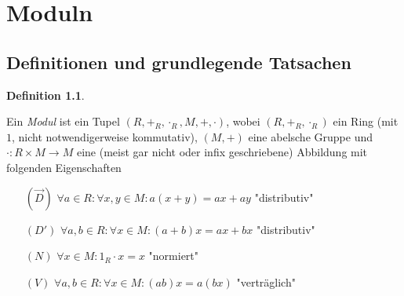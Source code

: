 \documentclass[
twoside=semi,
fontsize=12,
DIV=12, 
cleardoublepage=current,
leqno,
headings=optiontoheadandtoc, 
toc=idx
]{scrbook}
\theoremstyle{definition}
\newtheorem{definition}{Definition}[section]
\begin{document}
	\pagestyle{empty}
	\tableofcontents
	\mainmatter
	\chapter[tocentry={Moduln}]{Moduln}
	\pagestyle{scrheadings}
	
	\section{Definitionen und grundlegende Tatsachen}
	\setcounter{chapter}{1}
	\setcounter{section}{1}
	\begin{definition}
		\label{1.1.1}
		
		Ein \emph{Modul} ist ein Tupel $(R, +_R, \cdot_R, M, +, \cdot)$, wobei $(R, +_R, \cdot_R)$ ein Ring (mit $1$, nicht notwendigerweise kommutativ), $(M, +)$ eine abelsche Gruppe und \\\noindent$\cdot:R\times M \to M$ eine (meist gar nicht oder infix geschriebene) Abbildung mit folgenden Eigenschaften
		
		\begin{itemize}
			\item[$(\overset{\rightarrow}{D})$] $\forall a \in R: \forall x, y \in M: a(x + y) = ax + ay$ \hfill "distributiv"
			
			\item[$(D')$] $\forall a, b \in R: \forall x \in M: (a+b)x = ax + bx$ \hfill "distributiv"
			
			\item[$(N)$] $\forall x \in M: 1_R \cdot x = x$ \hfill "normiert"
			
			\item[$(V)$] $\forall a, b \in R: \forall x \in M: (ab)x = a(bx)$ \hfill "vertr\"aglich"
		\end{itemize}
	\end{definition}
	
\end{document}
